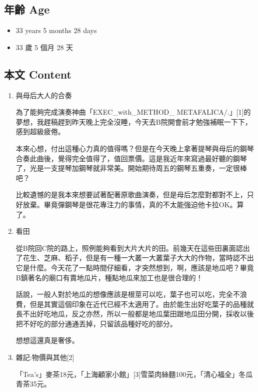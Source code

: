 \documentclass[a5paper, 12pt
]{book}
\providecommand{\tightlist}{%
  \setlength{\itemsep}{0pt}\setlength{\parskip}{0pt}}
\begin{document}
\hypertarget{ux5e74ux9f61-age-22}{%
\subsection{年齡 Age}\label{ux5e74ux9f61-age-22}}

\begin{itemize}
\tightlist
\item
  33 years 5 months 28 days
\item
  33 歲 5 個月 28 天
\end{itemize}

\hypertarget{ux672cux6587-content-22}{%
\subsection{本文 Content}\label{ux672cux6587-content-22}}

\begin{enumerate}
\def\labelenumi{\arabic{enumi}.}
\item
  與母后大人的合奏

  為了能夠完成演奏神曲「EXEC\_with\_METHOD\_
METAFALICA/.」{[}1{]}的夢想，我趕稿趕到昨天晚上完全沒睡，今天去B院開會前才勉強補眠一下下，感到超級疲倦。

  本來心想，付出這種心力真的值得嗎？但是在今天晚上拿著提琴與母后的鋼琴合奏此曲後，覺得完全值得了，值回票價。這是我近年來寫過最好聽的鋼琴了，光是一支提琴加鋼琴就非常美。開始期待周五的鋼琴五重奏，一定很棒吧？

  比較遺憾的是我本來想要試著配著原歌曲演奏，但是母后怎麼對都對不上，只好放棄。畢竟彈鋼琴是很花專注力的事情，真的不太能強迫他卡拉OK。算了。
\item
  看田

  從B院回C院的路上，照例能夠看到大片大片的田。前幾天在這些田裏面認出了花生、芝麻、稻子，但是有一種一大叢一大叢葉子大大的作物，當時認不出它是什麼。今天花了一點時間仔細看，才突然想到，啊，應該是地瓜吧？畢竟B鎮著名的廟口有賣地瓜片，種點地瓜來加工也是很合理的！

  話說，一般人對於地瓜的想像應該是根莖可以吃，葉子也可以吃，完全不浪費，但是其實這個印象在近代已經不太適用了。由於能生出好吃葉子的品種就長不出好吃地瓜，反之亦然，所以一般都是地瓜葉田跟地瓜田分開，採收以後把不好吃的部分通通丟掉，只留該品種好吃的部分。

  想想這還真是奢侈。
\item
  雜記:物價與其他{[}2{]}

  「Tea's」麥茶18元，「上海顧家小館」{[}3{]}雪菜肉絲麵100元，「清心福全」冬瓜青茶35元。
\end{enumerate}
\end{document}
